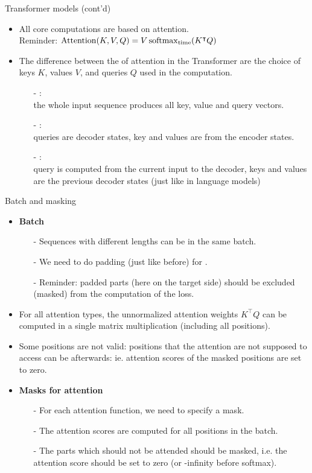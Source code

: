\begin{frame}{Transformer models (cont'd)}
\begin{itemize}
\item All core computations are based on attention.\\
Reminder: $\operatorname{Attention}(K, V, Q) = V \operatorname{softmax}_\text{time}(K^{\intercal} Q)$
\vsp
\item The difference between the  of attention in the Transformer are the choice of keys $K$, values $V$, and queries $Q$ used in the computation.
\vsp
\begin{itemize}
\item[-] :\\ the whole input sequence produces all key, value and query vectors.
\vsp
\item[-] :\\ queries are decoder states, key and values are from the encoder states.
\vsp
\item[-] :\\ query is computed from the current input to the decoder, keys and values are the previous decoder states (just like in language models)
\end{itemize}
\end{itemize}
\end{frame}


\begin{frame}{Batch and masking}
\begin{itemize}
\item \textbf{Batch}
\begin{itemize}
\item[-] Sequences with different lengths can be in the same batch.
\item[-] We need to do padding (just like before) for .
\item[-] Reminder: padded parts (here on the target side) should be excluded (masked) from
the computation of the loss.
\end{itemize}
\item For all attention types, the unnormalized attention weights $K^{\intercal} Q$ can be computed in a single matrix multiplication (including all positions).
\item Some positions are not valid: positions that the attention are not supposed to access can be  afterwards: ie. attention scores
of the masked positions are set to zero.
\vsp
\item \textbf{Masks for attention}
\begin{itemize}
\item[-] For each attention function, we need to specify a mask.
\item[-] The attention scores are computed for all positions in the batch.
\item[-] The parts which should not be attended should be masked, i.e. the attention score should be set to zero (or -infinity before softmax).
\end{itemize}
\end{itemize}
\end{frame}

